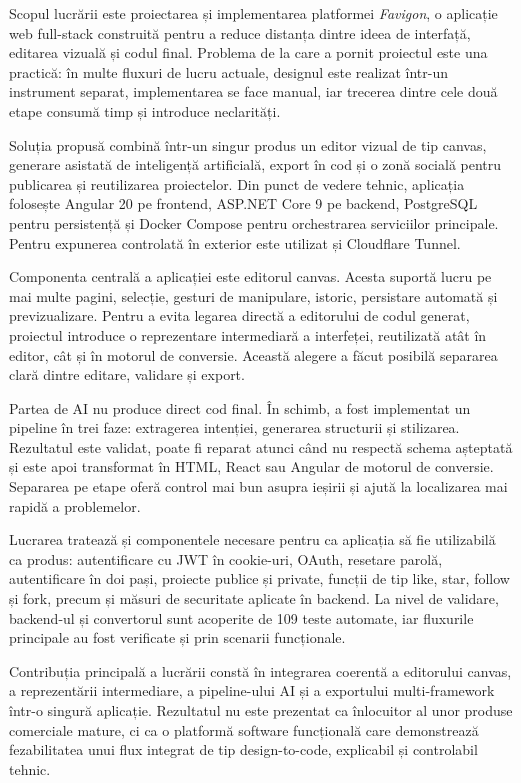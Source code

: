 Scopul lucrării este proiectarea și implementarea platformei \textit{Favigon}, o aplicație web full-stack construită pentru a reduce distanța dintre ideea de interfață, editarea vizuală și codul final. Problema de la care a pornit proiectul este una practică: în multe fluxuri de lucru actuale, designul este realizat într-un instrument separat, implementarea se face manual, iar trecerea dintre cele două etape consumă timp și introduce neclarități.

Soluția propusă combină într-un singur produs un editor vizual de tip canvas, generare asistată de inteligență artificială, export în cod și o zonă socială pentru publicarea și reutilizarea proiectelor. Din punct de vedere tehnic, aplicația folosește Angular 20 pe frontend, ASP.NET Core 9 pe backend, PostgreSQL pentru persistență și Docker Compose pentru orchestrarea serviciilor principale. Pentru expunerea controlată în exterior este utilizat și Cloudflare Tunnel.

Componenta centrală a aplicației este editorul canvas. Acesta suportă lucru pe mai multe pagini, selecție, gesturi de manipulare, istoric, persistare automată și previzualizare. Pentru a evita legarea directă a editorului de codul generat, proiectul introduce o reprezentare intermediară a interfeței, reutilizată atât în editor, cât și în motorul de conversie. Această alegere a făcut posibilă separarea clară dintre editare, validare și export.

Partea de AI nu produce direct cod final. În schimb, a fost implementat un pipeline în trei faze: extragerea intenției, generarea structurii și stilizarea. Rezultatul este validat, poate fi reparat atunci când nu respectă schema așteptată și este apoi transformat în HTML, React sau Angular de motorul de conversie. Separarea pe etape oferă control mai bun asupra ieșirii și ajută la localizarea mai rapidă a problemelor.

Lucrarea tratează și componentele necesare pentru ca aplicația să fie utilizabilă ca produs: autentificare cu JWT în cookie-uri, OAuth, resetare parolă, autentificare în doi pași, proiecte publice și private, funcții de tip like, star, follow și fork, precum și măsuri de securitate aplicate în backend. La nivel de validare, backend-ul și convertorul sunt acoperite de 109 teste automate, iar fluxurile principale au fost verificate și prin scenarii funcționale.

Contribuția principală a lucrării constă în integrarea coerentă a editorului canvas, a reprezentării intermediare, a pipeline-ului AI și a exportului multi-framework într-o singură aplicație. Rezultatul nu este prezentat ca înlocuitor al unor produse comerciale mature, ci ca o platformă software funcțională care demonstrează fezabilitatea unui flux integrat de tip design-to-code, explicabil și controlabil tehnic.

